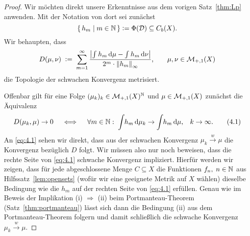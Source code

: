 \documentclass[../main/main.tex]{subfiles}
\begin{document}
	\begin{proof}
		Wir möchten direkt unsere Erkenntnisse aus dem vorigen 
		Satz~\ref{thm:Lp} anwenden. Mit der Notation von dort sei zunächst 
		\[\left\{\, h_m \; \middle| \; m \in \mathbb{N} \,\right\} \vcentcolon = \Phi(\mathcal{D}) \subseteq C_b(X) \text{.}\] 
		Wir behaupten, dass
		\[D(\mu, \nu) \; \vcentcolon = \; \sum_{m=1}^{\infty} \frac{\left| \int_{} \, h_m \, \mathrm{d}\mu - 
				\int_{} \, h_m \, \mathrm{d}\nu \right|}{2^m \cdot \left\lVert h_m\right\rVert_\infty} \text{,} 
		\qquad \mu, \nu \in \mathcal{M}_{+,1}(X) \]
		die Topologie der schwachen Konvergenz metrisiert. 
		
		Offenbar gilt für eine Folge 
		$(\mu_k)_k \in \mathcal{M}_{+,1}(X)^{\mathbb{N}}$ und $\mu \in \mathcal{M}_{+,1}(X)$ zunächst die 
		Äquivalenz
		\[ D(\mu_k, \mu) \to 0 \quad \iff \quad \forall m \in \mathbb{N}: \; 
		\int_{} \, h_m \, \mathrm{d}\mu_k \to \int_{} \, h_m \, \mathrm{d}\mu\text{,} 
		\quad k \to \infty \text{.} \label{eq:4.1} \tag{4.1} \]
		An \eqref{eq:4.1} sehen wir direkt, dass aus der schwachen Konvergenz 
		$\mu_k \xrightarrow{w} \mu$ die Konvergenz bezüglich $D$ folgt. Wir 
		müssen also nur noch beweisen, dass die rechte Seite von \eqref{eq:4.1} 
		schwache Konvergenz impliziert. Hierfür werden wir zeigen, dass für jede 
		abgeschlossene Menge $C \subseteq X$ die Funktionen $f_n, \; n \in \mathbb{N}$ aus 
		Hilfssatz~\ref{lem:opensets} (wofür wir eine geeignete Metrik auf $X$ wählen) 
		dieselbe Bedingung wie die $h_m$ auf der rechten Seite von \eqref{eq:4.1} 
		erfüllen. Genau wie im Beweis der Implikation (i) $\Rightarrow$ (ii) beim 
		Portmanteau-Theorem (Satz~\ref{thm:portmanteau}) lässt sich dann 
		die Bedingung (ii) aus dem Portmanteau-Theorem folgern und damit schließlich 
		die schwache Konvergenz $\mu_k \xrightarrow{w} \mu$.
		

\end{proof}
\end{document}
